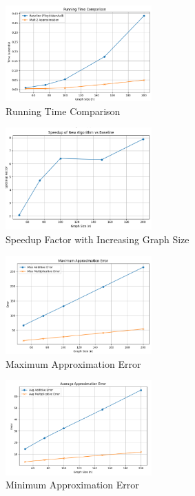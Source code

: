 \documentclass[a4paper,11pt,oneside]{book}
\begin{document}
\begin{figure}[H]
\centering
\includegraphics[width=0.5\textwidth]{figures/running_time.png}
\caption{Running Time Comparison}
\end{figure}

\begin{figure}[H]
\centering
\includegraphics[width=0.5\textwidth]{figures/speedup.png}
\caption{Speedup Factor with Increasing Graph Size}
\end{figure}

\begin{figure}[H]
\centering
\includegraphics[width=0.5\textwidth]{figures/max.png}
\caption{Maximum Approximation Error}
\end{figure}

\begin{figure}[H]
\centering
\includegraphics[width=0.5\textwidth]{figures/min.png}
\caption{Minimum Approximation Error}
\end{figure} \\
\clearpage
\end{document}
